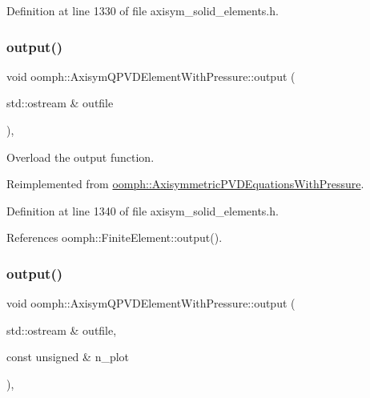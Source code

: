 Definition at line 1330 of file axisym\+\_\+solid\+\_\+elements.\+h.

\mbox{\label{classoomph_1_1AxisymQPVDElementWithPressure_a1df3ba1290d73dd33634d5b99993dee7}} 
\subsubsection{\texorpdfstring{output()}{output()}\hspace{0.1cm}{\footnotesize\ttfamily [1/4]}}
{\footnotesize\ttfamily void oomph\+::\+Axisym\+Q\+P\+V\+D\+Element\+With\+Pressure\+::output (\begin{DoxyParamCaption}\item[{std\+::ostream \&}]{outfile }\end{DoxyParamCaption})\hspace{0.3cm}{\ttfamily [inline]}, {\ttfamily [virtual]}}



Overload the output function. 



Reimplemented from \hyperlink{classoomph_1_1AxisymmetricPVDEquationsWithPressure_aba49f4147fb78fa74cd591b4a77eab98}{oomph\+::\+Axisymmetric\+P\+V\+D\+Equations\+With\+Pressure}.



Definition at line 1340 of file axisym\+\_\+solid\+\_\+elements.\+h.



References oomph\+::\+Finite\+Element\+::output().

\mbox{\label{classoomph_1_1AxisymQPVDElementWithPressure_aa7bf745c0767590c36a761d3a6399e57}} 
\subsubsection{\texorpdfstring{output()}{output()}\hspace{0.1cm}{\footnotesize\ttfamily [2/4]}}
{\footnotesize\ttfamily void oomph\+::\+Axisym\+Q\+P\+V\+D\+Element\+With\+Pressure\+::output (\begin{DoxyParamCaption}\item[{std\+::ostream \&}]{outfile,  }\item[{const unsigned \&}]{n\+\_\+plot }\end{DoxyParamCaption})\hspace{0.3cm}{\ttfamily [inline]}, {\ttfamily [virtual]}}



